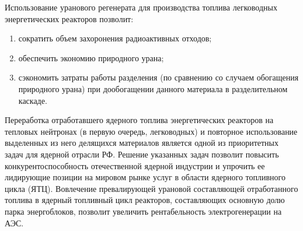Использование уранового регенерата для производства топлива легководных энергетических реакторов позволит: 
\begin{enumerate}
  \item сократить объем захоронения радиоактивных отходов; 
  \item обеспечить экономию природного урана;
  \item сэкономить затраты работы разделения (по сравнению со случаем обогащения природного урана) при дообогащении данного материала в разделительном каскаде. 
\end{enumerate}


Переработка отработавшего ядерного топлива энергетических реакторов на тепловых нейтронах (в первую очередь, легководных) и повторное использование выделенных из него делящихся материалов является одной из приоритетных задач для ядерной отрасли РФ. Решение указанных задач позволит повысить конкурентоспособность отечественной ядерной индустрии и упрочить ее лидирующие позиции на мировом рынке услуг в области ядерного топливного цикла (ЯТЦ). Вовлечение превалирующей урановой составляющей отработанного топлива в ядерный топливный цикл реакторов, составляющих основную долю парка энергоблоков, позволит увеличить рентабельность электрогенерации на АЭС.







